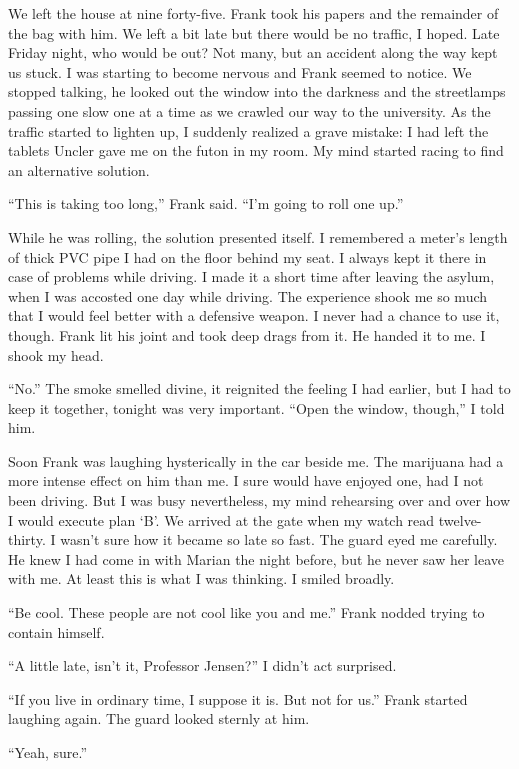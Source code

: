 We left the house at nine forty-five. Frank took his papers and the
remainder of the bag with him. We left a bit late but there would be no
traffic, I hoped. Late Friday night, who would be out? Not many, but an
accident along the way kept us stuck. I was starting to become nervous
and Frank seemed to notice. We stopped talking, he looked out the window
into the darkness and the streetlamps passing one slow one at a time as
we crawled our way to the university. As the traffic started to lighten
up, I suddenly realized a grave mistake: I had left the tablets Uncler
gave me on the futon in my room. My mind started racing to find an
alternative solution.

``This is taking too long,'' Frank said. ``I'm going to roll one up.''

While he was rolling, the solution presented itself. I remembered a
meter's length of thick PVC pipe I had on the floor behind my seat. I
always kept it there in case of problems while driving. I made it a
short time after leaving the asylum, when I was accosted one day while
driving. The experience shook me so much that I would feel better with a
defensive weapon. I never had a chance to use it, though. Frank lit his
joint and took deep drags from it. He handed it to me. I shook my head.

``No.'' The smoke smelled divine, it reignited the feeling I had
earlier, but I had to keep it together, tonight was very important.
``Open the window, though,'' I told him.

Soon Frank was laughing hysterically in the car beside me. The marijuana
had a more intense effect on him than me. I sure would have enjoyed one,
had I not been driving. But I was busy nevertheless, my mind rehearsing
over and over how I would execute plan `B'. We arrived at the gate when
my watch read twelve-thirty. I wasn't sure how it became so late so
fast. The guard eyed me carefully. He knew I had come in with Marian the
night before, but he never saw her leave with me. At least this is what
I was thinking. I smiled broadly.

``Be cool. These people are not cool like you and me.'' Frank nodded
trying to contain himself.

``A little late, isn't it, Professor Jensen?'' I didn't act surprised.

``If you live in ordinary time, I suppose it is. But not for us.'' Frank
started laughing again. The guard looked sternly at him.

``Yeah, sure.''

